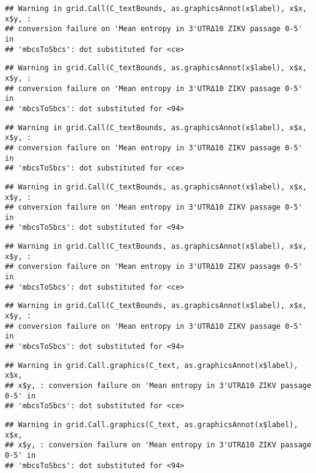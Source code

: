 \documentclass[
]{article}
\begin{document}
\begin{verbatim}
## Warning in grid.Call(C_textBounds, as.graphicsAnnot(x$label), x$x, x$y, :
## conversion failure on 'Mean entropy in 3'UTRΔ10 ZIKV passage 0-5' in
## 'mbcsToSbcs': dot substituted for <ce>
\end{verbatim}

\begin{verbatim}
## Warning in grid.Call(C_textBounds, as.graphicsAnnot(x$label), x$x, x$y, :
## conversion failure on 'Mean entropy in 3'UTRΔ10 ZIKV passage 0-5' in
## 'mbcsToSbcs': dot substituted for <94>
\end{verbatim}

\begin{verbatim}
## Warning in grid.Call(C_textBounds, as.graphicsAnnot(x$label), x$x, x$y, :
## conversion failure on 'Mean entropy in 3'UTRΔ10 ZIKV passage 0-5' in
## 'mbcsToSbcs': dot substituted for <ce>
\end{verbatim}

\begin{verbatim}
## Warning in grid.Call(C_textBounds, as.graphicsAnnot(x$label), x$x, x$y, :
## conversion failure on 'Mean entropy in 3'UTRΔ10 ZIKV passage 0-5' in
## 'mbcsToSbcs': dot substituted for <94>
\end{verbatim}

\begin{verbatim}
## Warning in grid.Call(C_textBounds, as.graphicsAnnot(x$label), x$x, x$y, :
## conversion failure on 'Mean entropy in 3'UTRΔ10 ZIKV passage 0-5' in
## 'mbcsToSbcs': dot substituted for <ce>
\end{verbatim}

\begin{verbatim}
## Warning in grid.Call(C_textBounds, as.graphicsAnnot(x$label), x$x, x$y, :
## conversion failure on 'Mean entropy in 3'UTRΔ10 ZIKV passage 0-5' in
## 'mbcsToSbcs': dot substituted for <94>
\end{verbatim}

\begin{verbatim}
## Warning in grid.Call.graphics(C_text, as.graphicsAnnot(x$label), x$x,
## x$y, : conversion failure on 'Mean entropy in 3'UTRΔ10 ZIKV passage 0-5' in
## 'mbcsToSbcs': dot substituted for <ce>
\end{verbatim}

\begin{verbatim}
## Warning in grid.Call.graphics(C_text, as.graphicsAnnot(x$label), x$x,
## x$y, : conversion failure on 'Mean entropy in 3'UTRΔ10 ZIKV passage 0-5' in
## 'mbcsToSbcs': dot substituted for <94>
\end{verbatim}
\end{document}
